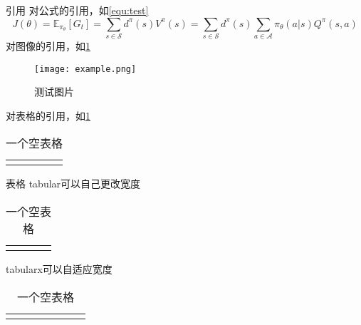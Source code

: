 \documentclass[dvipsnames, svgnames,a4paper,11pt]{article}
\begin{document}
\begin{tbox}{引用}
	对公式的引用，如\cref{equ:test}
	\begin{equation}
        J(\theta) = \mathbb{E}_{\pi_\theta}[G_t] = \sum_{s\in\mathcal{S}} d^\pi (s)V^\pi(s)=\sum_{s\in\mathcal{S}} d^\pi(s)\sum_{a\in\mathcal{A}}\pi_\theta(a|s)Q^\pi(s,a)
		\label{equ:test}
    \end{equation}
	对图像的引用，如\cref{fig:test}
	\begin{figure}[H]
		\centering
		\texttt{[image: example.png]}
		\caption{测试图片}
		\label{fig:test}
	\end{figure}
	对表格的引用，如\cref{tab:test}
	\begin{table}[H]
		\renewcommand\arraystretch{1.5}
		\caption{一个空表格}
		\begin{tabularx}{\textwidth}{|p{}|X|X|X|X|}
		\hline
		 &  &  &  &  \\    
		\hline
		 &  &  & &  \\    
		\hline
		\end{tabularx}
		\label{tab:test}
	\end{table}
\end{tbox}

\begin{tbox}{表格}
	tabular可以自己更改宽度
	\begin{table}[H]
		\renewcommand\arraystretch{1.7}
		\centering
		\caption{一个空表格}
		\begin{tabular}{|p{}|p{}|p{}|p{}|}
		\hline
		&   &  &  \\
		\hline
		 &   &  &  \\
		\hline    
		\end{tabular}
	\end{table}
	tabularx可以自适应宽度
	\begin{table}[H]
		\renewcommand\arraystretch{1.7}
		\centering
		\caption{一个空表格}
		\begin{tabularx}{\textwidth}{|p{}|X|X|X|X|X|X|}
			\hline
			& &  &  &  &  &  \\
			\hline
			 & &  &  &  &  &  \\
			\hline
		\end{tabularx}
	\end{table}
\end{tbox}
\end{document}
